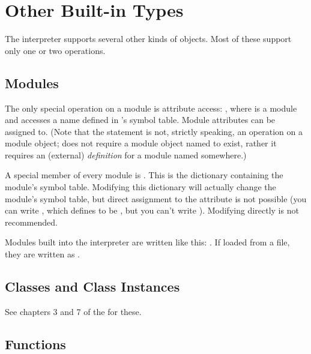 \section{Other Built-in Types \label{typesother}}

The interpreter supports several other kinds of objects.
Most of these support only one or two operations.


\subsection{Modules \label{typesmodules}}

The only special operation on a module is attribute access:
, where  is a module and 
accesses a name defined in 's symbol table.  Module attributes
can be assigned to.  (Note that the  statement is not,
strictly speaking, an operation on a module object;  does not require a module object named  to exist,
rather it requires an (external) \emph{definition} for a module named
 somewhere.)

A special member of every module is .
This is the dictionary containing the module's symbol table.
Modifying this dictionary will actually change the module's symbol
table, but direct assignment to the  attribute is not
possible (you can write , which
defines  to be , but you can't write
).  Modifying  directly
is not recommended.

Modules built into the interpreter are written like this:
.  If loaded from a file, they are
written as .


\subsection{Classes and Class Instances \label{typesobjects}}

See chapters 3 and 7 of the  for these.


\subsection{Functions \label{typesfunctions}}

